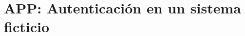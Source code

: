 \documentclass[a4paper,12pt, twoside, openright,makeidx]{book}
\newcommand\blankpage{%
    \null
    \thispagestyle{empty}%
    \addtocounter{page}{-1}%
    \newpage}
\begin{document}
\chapter{APP: Autenticación en un sistema ficticio}
\label{APP: Autenticación en sistema ficticio}

%
%



\nocite{*}
\afterpage{\blankpage}	%

\end{document}
